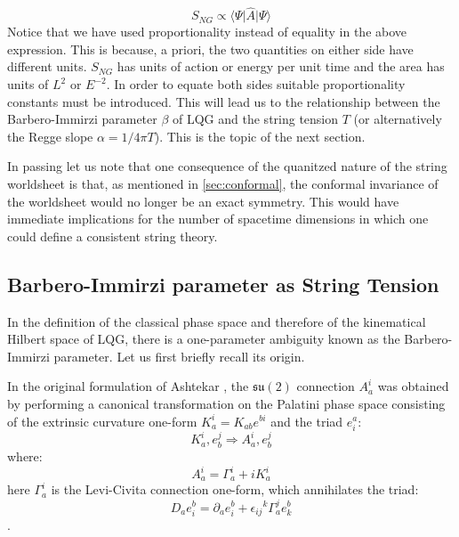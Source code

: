 \documentclass[submission, Phys]{SciPost}
\newcommand{\mf}[1]{\mathfrak{#1}}
\newcommand{\expect}[1]{\langle #1\rangle}
\begin{document}
\begin{equation}\label{eqn:emergent-action}
	S_{NG} \propto \expect{\Psi\vert \hat A \vert \Psi}
\end{equation}
Notice that we have used proportionality instead of equality in the above expression. This is because, a priori, the two quantities on either side have different units. $ S_{NG} $ has units of action or energy per unit time and the area has units of $ L^2 $ or $ E^{-2} $. In order to equate both sides suitable proportionality constants must be introduced. This will lead us to the relationship between the Barbero-Immirzi parameter $ \beta $ of LQG \cite{Barbero1996From,Immirzi1996Real} and the string tension $ T $ (or alternatively the Regge slope $ \alpha = 1/4\pi T$). This is the topic of the next section.

In passing let us note that one consequence of the quanitzed nature of the string worldsheet is that, as mentioned in \autoref{sec:conformal}, the conformal invariance of the worldsheet would no longer be an exact symmetry. This would have immediate implications for the number of spacetime dimensions in which one could define a consistent string theory.

\subsection{Barbero-Immirzi parameter as String Tension}

In the definition of the classical phase space and therefore of the kinematical Hilbert space of LQG, there is a one-parameter ambiguity \cite{Barbero1996From,Immirzi1996Real} known as the Barbero-Immirzi parameter. Let us first briefly recall its origin.

In the original formulation of Ashtekar \cite{Ashtekar1986New,Ashtekar1987New}, the $ \mf{su}(2) $ connection $ A_a^i $ was obtained by performing a canonical transformation on the Palatini phase space consisting of the extrinsic curvature one-form $ K^i_a = K_{ab} e^{bi} $ and the triad $ e^a_i $:
\begin{equation}\label{eqn:phase-space}
	K^i_a, e^j_b \Rightarrow A^i_a, e^j_b
\end{equation}
where:
\begin{equation}\label{eqn:ashtekar-transform}
	A^i_a = \Gamma^i_a + i K^i_a
\end{equation}
here $ \Gamma^i_a $ is the Levi-Civita connection one-form, which annihilates the triad:
$$ D_a e^b_i = \partial_a e^b_i + \epsilon_{ij}{}^k \Gamma^j_a e^b_k $$.
\end{document}
